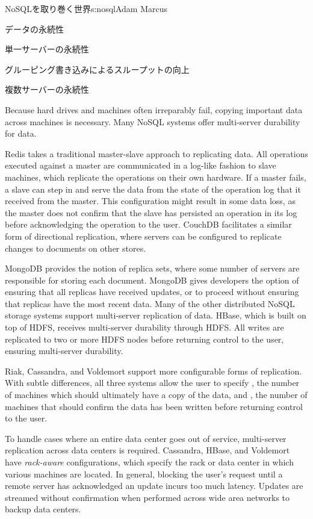 \begin{aosachapter}{NoSQLを取り巻く世界}{s:nosql}{Adam Marcus}
\begin{aosasect1}{データの永続性}
\begin{aosasect2}{単一サーバーの永続性}
\begin{aosasect3}{グルーピング書き込みによるスループットの向上}
\end{aosasect3}

\end{aosasect2}

\begin{aosasect2}{複数サーバーの永続性}

Because hard drives and machines often irreparably fail, copying
important data across machines is necessary.  Many NoSQL systems offer
multi-server durability for data.

Redis takes a traditional master-slave approach to replicating data.
All operations executed against a master are communicated in a
log-like fashion to slave machines, which replicate the operations on
their own hardware.  If a master fails, a slave can step in and serve
the data from the state of the operation log that it received from the
master.  This configuration might result in some data loss, as the
master does not confirm that the slave has persisted an operation in
its log before acknowledging the operation to the user.  CouchDB
facilitates a similar form of directional replication, where servers
can be configured to replicate changes to documents on other stores.

MongoDB provides the notion of replica sets, where some number of
servers are responsible for storing each document.  MongoDB gives
developers the option of ensuring that all replicas have received
updates, or to proceed without ensuring that replicas have the most
recent data.  Many of the other distributed NoSQL storage systems
support multi-server replication of data.  HBase, which is built on
top of HDFS, receives multi-server durability through HDFS\@.  All
writes are replicated to two or more HDFS nodes before returning
control to the user, ensuring multi-server durability.

Riak, Cassandra, and Voldemort support more configurable forms of
replication.  With subtle differences, all three systems allow the
user to specify , the number of machines which should
ultimately have a copy of the data, and ,
the number of machines that should confirm the data has been written
before returning control to the user.

To handle cases where an entire data center goes out of service,
multi-server replication across data centers is required.  Cassandra,
HBase, and Voldemort have \emph{rack-aware} configurations, which
specify the rack or data center in which various machines are located.
In general, blocking the user's request until a remote server has
acknowledged an update incurs too much latency. Updates are streamed
without confirmation when performed across wide area networks to
backup data centers.


\end{aosasect2}
\end{aosasect1}
\end{aosachapter}
